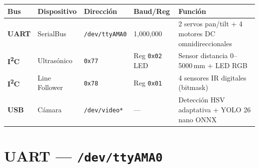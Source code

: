 \documentclass[11pt,a4paper]{article}
\begin{document}
\begin{center}
{%
}
\end{center}

\vspace{0.3em}


\begin{infobox}[title={Resumen de Buses}]
\centering\small
\begin{tabularx}{\textwidth}{l l l l X}
\toprule
\textbf{Bus} & \textbf{Dispositivo} & \textbf{Direcci\'{o}n} & \textbf{Baud/Reg} & \textbf{Funci\'{o}n} \\
\midrule
\textcolor{uartcolor}{\textbf{UART}} & SerialBus & \texttt{/dev/ttyAMA0} & 1,000,000 & 2 servos pan/tilt + 4 motores DC omnidireccionales \\
\textcolor{i2ccolor}{\textbf{I\textsuperscript{2}C}} & Ultras\'{o}nico & \texttt{0x77} & Reg \texttt{0x02} LED & Sensor distancia 0--5000\,mm + LED RGB \\
\textcolor{i2ccolor}{\textbf{I\textsuperscript{2}C}} & Line Follower & \texttt{0x78} & Reg \texttt{0x01} & 4 sensores IR digitales (bitmask) \\
\textcolor{usbcolor}{\textbf{USB}} & C\'{a}mara & \texttt{/dev/video*} & --- & Detecci\'{o}n HSV adaptativa + YOLO 26 nano ONNX \\
\bottomrule
\end{tabularx}
\end{infobox}

\newpage


\section{\textcolor{uartcolor}{UART} --- \texttt{/dev/ttyAMA0}}
\end{document}
